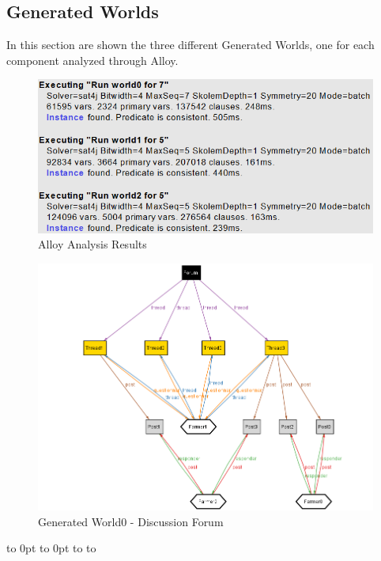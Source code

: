 \subsection{Generated Worlds}

In this section are shown the three different Generated Worlds, one for each component analyzed through Alloy.\\



\begin{figure}[H]
  \includegraphics[width=\textwidth,height=\textheight,keepaspectratio]{./Images/Alloy/predicatesExecution.png}
           \vspace*{-0.5cm}
  \caption{Alloy Analysis Results}
\end{figure}



\def\fillandplacepagenumber{%
 \par\pagestyle{empty}%
\vbox to 0pt{\vss}\vfill
\vbox to 0pt{\baselineskip0pt
   \hbox to\linewidth{\hss}%
   \setlength{\footskip}{70pt}
   \baselineskip\footskip
   \hbox to\linewidth{%
     \hfil\thepage\hfil}\vss}}

\begin{landscape}
\begin{figure}[h]
\vspace*{-2cm}
\noindent
\centering
\centerline{\includegraphics[scale = 0.6]{./Images/Alloy/DiscussionForum.png}}
    \caption{Generated World0 - Discussion Forum}
    \vspace*{-12cm}
\end{figure}
\fillandplacepagenumber
\end{landscape}


